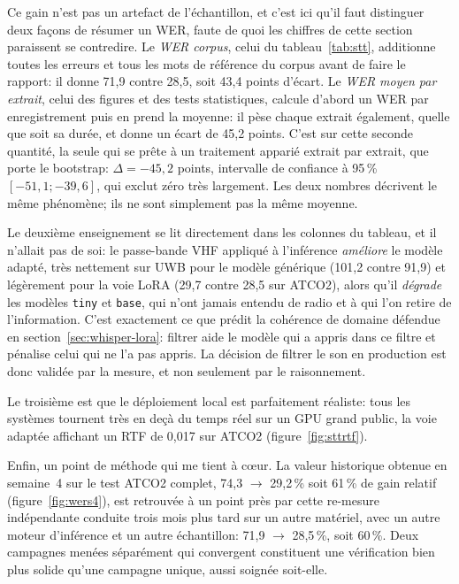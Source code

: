 \documentclass[11pt,a4paper]{article}
\begin{document}
Ce gain n'est pas un artefact de l'échantillon, et c'est ici qu'il faut distinguer deux façons de résumer un WER, faute de quoi les chiffres de cette section paraissent se contredire. Le \emph{WER corpus}, celui du tableau~\ref{tab:stt}, additionne toutes les erreurs et tous les mots de référence du corpus avant de faire le rapport: il donne 71,9 contre 28,5, soit 43,4 points d'écart. Le \emph{WER moyen par extrait}, celui des figures et des tests statistiques, calcule d'abord un WER par enregistrement puis en prend la moyenne: il pèse chaque extrait également, quelle que soit sa durée, et donne un écart de 45,2 points. C'est sur cette seconde quantité, la seule qui se prête à un traitement apparié extrait par extrait, que porte le bootstrap: $\Delta = -45{,}2$ points, intervalle de confiance à 95\,\% $[-51{,}1; -39{,}6]$, qui exclut zéro très largement. Les deux nombres décrivent le même phénomène; ils ne sont simplement pas la même moyenne.

Le deuxième enseignement se lit directement dans les colonnes du tableau, et il n'allait pas de soi: le passe-bande VHF appliqué à l'inférence \emph{améliore} le modèle adapté, très nettement sur UWB pour le modèle générique (101,2 contre 91,9) et légèrement pour la voie LoRA (29,7 contre 28,5 sur ATCO2), alors qu'il \emph{dégrade} les modèles \texttt{tiny} et \texttt{base}, qui n'ont jamais entendu de radio et à qui l'on retire de l'information. C'est exactement ce que prédit la cohérence de domaine défendue en section~\ref{sec:whisper-lora}: filtrer aide le modèle qui a appris dans ce filtre et pénalise celui qui ne l'a pas appris. La décision de filtrer le son en production est donc validée par la mesure, et non seulement par le raisonnement.

Le troisième est que le déploiement local est parfaitement réaliste: tous les systèmes tournent très en deçà du temps réel sur un GPU grand public, la voie adaptée affichant un RTF de 0,017 sur ATCO2 (figure~\ref{fig:sttrtf}).

Enfin, un point de méthode qui me tient à c\oe ur. La valeur historique obtenue en semaine~4 sur le test ATCO2 complet, 74,3 $\rightarrow$ 29,2\,\% soit 61\,\% de gain relatif (figure~\ref{fig:wers4}), est retrouvée à un point près par cette re-mesure indépendante conduite trois mois plus tard sur un autre matériel, avec un autre moteur d'inférence et un autre échantillon: 71,9 $\rightarrow$ 28,5\,\%, soit 60\,\%. Deux campagnes menées séparément qui convergent constituent une vérification bien plus solide qu'une campagne unique, aussi soignée soit-elle.
\end{document}
